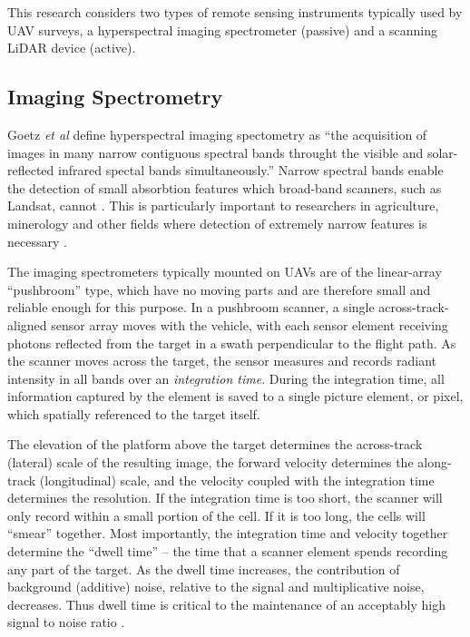 \documentclass[10pt]{article}
\begin{document}
This research considers two types of remote sensing instruments typically used by UAV surveys, a hyperspectral imaging spectrometer (passive) and a scanning LiDAR device (active). 

\subsection{Imaging Spectrometry}

Goetz \emph{et al} \cite{Goetz1985} define hyperspectral imaging spectometry as ``the acquisition of images in many narrow contiguous spectral bands throught the visible and solar-reflected infrared spectal bands simultaneously.'' Narrow spectral bands enable the detection of small absorbtion features which broad-band scanners, such as Landsat, cannot \cite{Goetz1985}. This is particularly important to researchers in agriculture, minerology and other fields where detection of extremely narrow features is necessary \cite{Goetz1985}.

The imaging spectrometers typically mounted on UAVs are of the linear-array ``pushbroom'' type, which have no moving parts and are therefore small and reliable enough for this purpose. In a pushbroom scanner, a single across-track-aligned sensor array moves with the vehicle, with each sensor element receiving photons reflected from the target in a swath perpendicular to the flight path. As the scanner moves across the target, the sensor measures and records radiant intensity in all bands over an \emph{integration time}. During the integration time, all information captured by the element is saved to a single picture element, or pixel, which spatially referenced to the target itself. 

The elevation of the platform above the target determines the across-track (lateral) scale of the resulting image, the forward velocity determines the along-track (longitudinal) scale, and the velocity coupled with the integration time determines the resolution. If the integration time is too short, the scanner will only record within a small portion of the cell. If it is  too long, the cells will ``smear'' together. Most importantly, the integration time and velocity together determine the ``dwell time'' -- the time that a scanner element spends recording any part of the target. As the dwell time increases, the contribution of background (additive) noise, relative to the signal and multiplicative noise, decreases. Thus dwell time is critical to the maintenance of an acceptably high signal to noise ratio \cite{F.MarkDanson1996,Avery1992,Rogass2014}.
\end{document}
